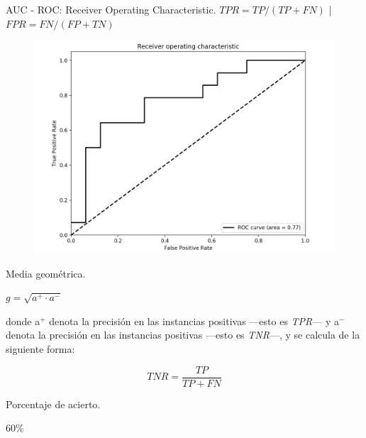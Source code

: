 \documentclass[10pt]{beamer}
\newcommand{\cmark}{\ding{51}}
\newcommand{\xmark}{\ding{55}}
\begin{document}
\begin{frame}{AUC - ROC: Receiver Operating Characteristic.}
\centering
$TPR = TP / (TP + FN)$ | $FPR = FN / (FP + TN)$
\begin{figure}[H]
\includegraphics[scale=0.33]{./imagenes/roc}
\end{figure}
\end{frame}

\begin{frame}{Media geométrica.}
\begin{center}
	$g = \sqrt{a^+ \cdot a^-}$
\end{center}

donde a$^+$ denota la precisión en las instancias positivas —esto es \textit{TPR}— y a$^-$ denota la precisión en las instancias positivas —esto es \textit{TNR}—, y se calcula de la siguiente forma:

\begin{equation}
	TNR = \frac{TP}{TP + FN}
\end{equation}
\end{frame}

\begin{frame}{Porcentaje de acierto.}
	\centering
	
	
	
	60\%
\end{frame}
\end{document}
